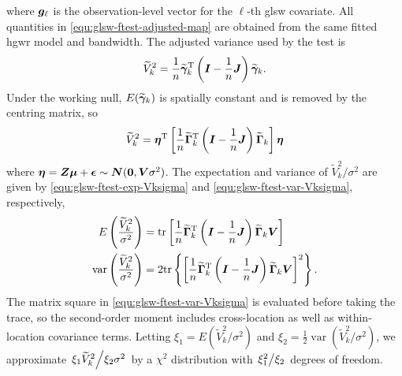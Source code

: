 \documentclass[times]{interact}
\theoremstyle{plain}%
\theoremstyle{definition}
\theoremstyle{remark}
\begin{document}
where $\bm{g}_\ell$ is the observation-level vector for the $\ell$-th \gls{glsw} covariate.
All quantities in \autoref{equ:glsw-ftest-adjusted-map} are obtained from the same fitted \gls{hgwr} model and bandwidth.
The adjusted variance used by the test is
\begin{equation}\label{equ:glsw-ftest-adjusted-variance}
  \widetilde V_k^2
  =\frac{1}{n}\widetilde{\bm{\gamma}}_{k}^\mathrm{T}
  \left(\bm{I}-\frac{1}{n}\bm{J}\right)
  \widetilde{\bm{\gamma}}_{k}.
\end{equation}
Under the working null, $E(\widetilde{\bm{\gamma}}_{k})$ is spatially constant and is removed by the centring matrix, so
\begin{equation*}
    \widetilde V_{k}^2  = \bm{\eta}^{\mathrm{T}}\left[ \frac{1}{n} \widetilde{\bm{\Gamma}}_k^\mathrm{T}\left( \bm{I}-\frac{1}{n}\bm{J}\right)\widetilde{\bm{\Gamma}}_k \right]\bm{\eta}
\end{equation*}
where $\bm{\eta}=\bm{Z}\bm{\mu}+\bm{\epsilon}\sim \bm{N}(\bm{0},\bm{V}\sigma^2)$.
The expectation and variance of $\widetilde V_k^2/\sigma^2$ are given by \autoref{equ:glsw-ftest-exp-Vksigma} and \autoref{equ:glsw-ftest-var-Vksigma}, respectively,
\begin{align}
\label{equ:glsw-ftest-exp-Vksigma}
E\left( \frac{\widetilde V_{k}^2}{\sigma^{2}} \right)  & = \mathrm{tr}\left[ \frac{1}{n} \widetilde{\bm{\Gamma}}_k^{\mathrm{T}} \left( \bm{I}-\frac{1}{n}\bm{J} \right) \widetilde{\bm{\Gamma}}_k \bm{V} \right]  \\
\label{equ:glsw-ftest-var-Vksigma}
\mathop{\mathrm{var}}\left( \frac{\widetilde V_{k}^2}{\sigma^{2}} \right) & = 2\mathrm{tr}\left\{ \left[ \frac{1}{n} \widetilde{\bm{\Gamma}}_k^{\mathrm{T}} \left( \bm{I}-\frac{1}{n}\bm{J} \right) \widetilde{\bm{\Gamma}}_k\bm{V} \right]^2 \right\} .
\end{align}
The matrix square in \autoref{equ:glsw-ftest-var-Vksigma} is evaluated before taking the trace, so the second-order moment includes cross-location as well as within-location covariance terms.
Letting $\xi_{1}=E({\widetilde V_{k}^2}/{\sigma^2})$ and $\xi_{2}=\frac{1}{2}\mathop{\mathrm{var}}({\widetilde V_{k}^2}/{\sigma^2})$,
we approximate $\left.{\xi_{1}\widetilde V_{k}^2}\middle/{\xi_{2}\sigma^2}\right.$ by a $\chi^2$ distribution with $\left.{\xi_1^2}\middle/{\xi_2}\right.$ degrees of freedom.
\end{document}
